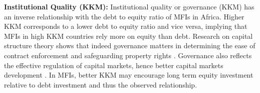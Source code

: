 \documentclass[a4paper,nobind]{templates/ociamthesis}
\newenvironment{Shaded}{\begin{snugshade}}{\end{snugshade}}
\newcommand{\AttributeTok}[1]{\textcolor[rgb]{0.77,0.63,0.00}{#1}}
\newcommand{\DocumentationTok}[1]{\textcolor[rgb]{0.56,0.35,0.01}{\textbf{\textit{#1}}}}
\newcommand{\FunctionTok}[1]{\textcolor[rgb]{0.00,0.00,0.00}{#1}}
\newcommand{\NormalTok}[1]{#1}
\newcommand{\OtherTok}[1]{\textcolor[rgb]{0.56,0.35,0.01}{#1}}
\newcommand{\SpecialCharTok}[1]{\textcolor[rgb]{0.00,0.00,0.00}{#1}}
\newcommand{\StringTok}[1]{\textcolor[rgb]{0.31,0.60,0.02}{#1}}
\renewenvironment{Shaded}
{
  \vspace{10pt}%
  \begin{snugshade}%
}{%
  \end{snugshade}%
  \vspace{8pt}%
}
\begin{document}
\textbf{Institutional Quality (KKM):} Institutional quality or governance (KKM) has an inverse relationship with the debt to equity ratio of MFIs in Africa. Higher KKM corresponds to a lower debt to equity ratio and vice versa, implying that MFIs in high KKM countries rely more on equity than debt. Research on capital structure theory shows that indeed governance matters in determining the ease of contract enforcement and safeguarding property rights \autocite{butkiewicz2006institutional}. Governance also reflects the effective regulation of capital markets, hence better capital markets development \autocite{matias2017there,ombati2016effects}. In MFIs, better KKM may encourage long term equity investment relative to debt investment and thus the observed relationship.

\begin{landscape}

\begin{Shaded}
\end{Shaded}
\end{landscape}
\end{document}
